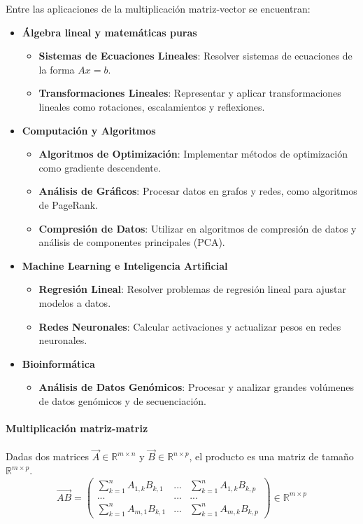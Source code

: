 Entre las aplicaciones de la multiplicación matriz-vector se encuentran:
\begin{itemize}
\item \textbf{Álgebra lineal y matemáticas puras}
\begin{itemize}
\item \textbf{Sistemas de Ecuaciones Lineales}: Resolver sistemas de ecuaciones de la forma \(Ax = b\).
\item \textbf{Transformaciones Lineales}: Representar y aplicar transformaciones lineales como rotaciones, escalamientos y reflexiones.
\end{itemize}
\item \textbf{Computación y Algoritmos}
\begin{itemize}
\item \textbf{Algoritmos de Optimización}: Implementar métodos de optimización como gradiente descendente.
\item \textbf{Análisis de Gráficos}: Procesar datos en grafos y redes, como algoritmos de PageRank.
\item \textbf{Compresión de Datos}: Utilizar en algoritmos de compresión de datos y análisis de componentes principales (PCA).
\end{itemize}
\item \textbf{Machine Learning e Inteligencia Artificial}
\begin{itemize}
\item \textbf{Regresión Lineal}: Resolver problemas de regresión lineal para ajustar modelos a datos.
\item \textbf{Redes Neuronales}: Calcular activaciones y actualizar pesos en redes neuronales.
\end{itemize}
\item \textbf{Bioinformática}
\begin{itemize}
\item \textbf{Análisis de Datos Genómicos}: Procesar y analizar grandes volúmenes de datos genómicos y de secuenciación.
\end{itemize}
\end{itemize}

\paragraph{Multiplicación matriz-matriz} Dadas dos matrices $\vec{A} \in \mathbb{R}^{m \times n}$ y $\vec{B} \in \mathbb{R}^{n \times p}$, el producto es una matriz de tamaño $\mathbb{R}^{m \times p}$.
$$\vec{AB} = \begin{pmatrix}
\sum^n_{k=1}A_{1,k}B_{k,1} & ... & \sum^n_{k=1}A_{1,k}B_{k,p} \\
... & ... & ...\\
\sum^n_{k=1}A_{m,1}B_{k,1} & ... & \sum^n_{k=1}A_{m,k}B_{k,p}
\end{pmatrix} \in \mathbb{R}^{m \times p}$$

